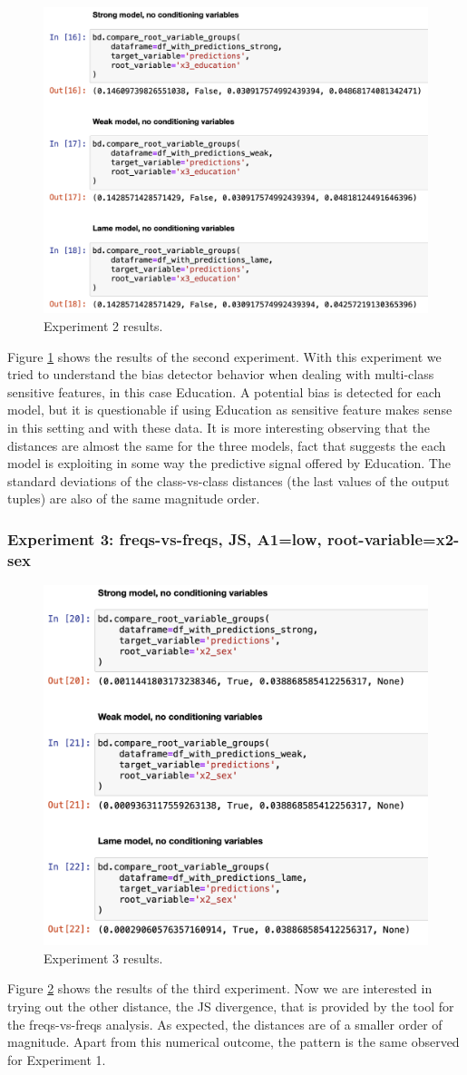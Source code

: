 \documentclass[
]{ceurart}
\begin{document}
\begin{figure}[h!]
  \includegraphics[width=.7\linewidth, left]{exp2.png}
  \caption{Experiment 2 results.}
  \label{fig:exp2}
\end{figure}
Figure \ref{fig:exp2} shows the results of the second experiment. With this experiment we tried to understand the bias detector behavior when dealing with multi-class sensitive features, in this case Education. A potential bias is detected for each model, but it is questionable if using Education as sensitive feature makes sense in this setting and with these data. It is more interesting observing that the distances are almost the same for the three models, fact that suggests the each model is exploiting in some way the predictive signal offered by Education. The standard deviations of the class-vs-class distances (the last values of the output tuples) are also of the same magnitude order.

\subsubsection{Experiment 3: freqs-vs-freqs, JS, A1=low, root-variable=x2-sex}

\begin{figure}[h!]
  \includegraphics[width=.7\linewidth, left]{exp3.png}
  \caption{Experiment 3 results.}
  \label{fig:exp3}
\end{figure}
Figure \ref{fig:exp3} shows the results of the third experiment. Now we are interested in trying out the other distance, the JS divergence, that is provided by the tool for the freqs-vs-freqs analysis. As expected, the distances are of a smaller order of magnitude. Apart from this numerical outcome, the pattern is the same observed for Experiment 1. 
\end{document}
